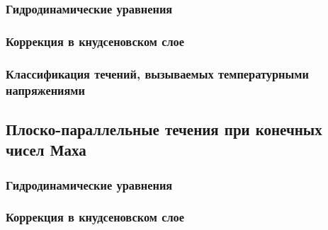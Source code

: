 \subsubsection{Гидродинамические уравнения}
\subsubsection{Коррекция в кнудсеновском слое}
\subsubsection{Классификация течений, вызываемых температурными напряжениями}

\subsection{Плоско-параллельные течения при конечных чисел Маха}

\subsubsection{Гидродинамические уравнения}
\subsubsection{Коррекция в кнудсеновском слое}

\clearpage
